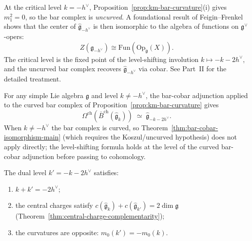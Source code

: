 \begin{remark}
\label{rem:feigin-frenkel-center}
At the critical level $k = -h^\vee$, Proposition~\ref{prop:km-bar-curvature}(i) gives $m_1^2 = 0$, so the bar complex is \emph{uncurved}.  A foundational result of Feigin--Frenkel~\cite{Feigin-Frenkel} shows that the center of $\widehat{\mathfrak{g}}_{-h^\vee}$ is then isomorphic to the algebra of functions on $\mathfrak{g}^\vee$-opers:
\[
Z(\widehat{\mathfrak{g}}_{-h^\vee}) \cong \mathrm{Fun}(\mathrm{Op}_{\check{\mathfrak{g}}}(X)).
\]
The critical level is the fixed point of the level-shifting involution $k \mapsto -k - 2h^\vee$, and the uncurved bar complex recovers $\widehat{\mathfrak{g}}_{-h^\vee}$ via cobar.  See Part~II for the detailed treatment.
\end{remark}

\begin{corollary}
\label{cor:level-shifting-part1}
For any simple Lie algebra $\mathfrak{g}$ and level $k \neq -h^\vee$, the bar-cobar adjunction applied to the curved bar complex of Proposition~\ref{prop:km-bar-curvature} gives
\begin{equation}\label{eq:level-shifting-part1}
\Omega^{\mathrm{ch}}(\bar{B}^{\mathrm{ch}}(\widehat{\mathfrak{g}}_k)) \;\simeq\; \widehat{\mathfrak{g}}_{-k-2h^\vee}.
\end{equation}
When $k \neq -h^\vee$ the bar complex is curved, so Theorem~\ref{thm:bar-cobar-isomorphism-main} (which requires the Koszul/uncurved hypothesis) does not apply directly; the level-shifting formula holds at the level of the curved bar-cobar adjunction before passing to cohomology.

The dual level $k' = -k - 2h^\vee$ satisfies:
\begin{enumerate}[label=\textup{(\roman*)}]
\item $k + k' = -2h^\vee$;
\item the central charges satisfy $c(\widehat{\mathfrak{g}}_k) + c(\widehat{\mathfrak{g}}_{k'}) = 2\dim\mathfrak{g}$ \textup{(}Theorem~\ref{thm:central-charge-complementarity}\textup{)};
\item the curvatures are opposite: $m_0(k') = -m_0(k)$.
\end{enumerate}
\end{corollary}


